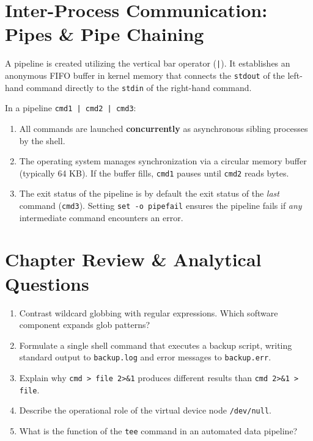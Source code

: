 \section{Inter-Process Communication: Pipes \& Pipe Chaining}
A pipeline is created utilizing the vertical bar operator (\texttt{|}). It establishes an anonymous FIFO buffer in kernel memory that connects the \texttt{stdout} of the left-hand command directly to the \texttt{stdin} of the right-hand command.

\begin{definition}
In a pipeline \texttt{cmd1 | cmd2 | cmd3}:
\begin{enumerate}[leftmargin=1.5em]
    \item All commands are launched \textbf{concurrently} as asynchronous sibling processes by the shell.
    \item The operating system manages synchronization via a circular memory buffer (typically 64 KB). If the buffer fills, \texttt{cmd1} pauses until \texttt{cmd2} reads bytes.
    \item The exit status of the pipeline is by default the exit status of the \textit{last} command (\texttt{cmd3}). Setting \texttt{set -o pipefail} ensures the pipeline fails if \textit{any} intermediate command encounters an error.
\end{enumerate}
\end{definition}


\section{Chapter Review \& Analytical Questions}
\begin{enumerate}[leftmargin=1.5em]
    \item Contrast wildcard globbing with regular expressions. Which software component expands glob patterns?
    \item Formulate a single shell command that executes a backup script, writing standard output to \texttt{backup.log} and error messages to \texttt{backup.err}.
    \item Explain why \texttt{cmd > file 2>\&1} produces different results than \texttt{cmd 2>\&1 > file}.
    \item Describe the operational role of the virtual device node \texttt{/dev/null}.
    \item What is the function of the \texttt{tee} command in an automated data pipeline?
\end{enumerate}
